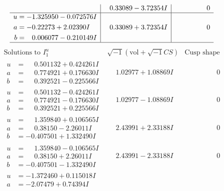 \documentclass[1p]{elsarticle_modified}
\theoremstyle{definition}
\newcommand{\I}{\sqrt{-1}}
\begin{document}
$$\begin{array}{c|c|c}
 & \phantom{-}0.33089 - 3.72354 I & \phantom{-0.000000 } 0 \\ \hline\begin{aligned}
u &= -1.325950 - 0.072576 I \\
a &= -0.22273 + 2.02390 I \\
b &= \phantom{-}0.006077 - 0.210149 I\end{aligned}
 & \phantom{-}0.33089 + 3.72354 I & \phantom{-0.000000 } 0\\
 \hline 
 \end{array}$$\newpage$$\begin{array}{c|c|c}  
\text{Solutions to }I^u_{1}& \I (\text{vol} + \sqrt{-1}CS) & \text{Cusp shape}\\
 \hline 
\begin{aligned}
u &= \phantom{-}0.501132 + 0.424261 I \\
a &= \phantom{-}0.774921 + 0.176630 I \\
b &= \phantom{-}0.392521 - 0.225566 I\end{aligned}
 & \phantom{-}1.02977 + 1.08869 I & \phantom{-0.000000 } 0 \\ \hline\begin{aligned}
u &= \phantom{-}0.501132 - 0.424261 I \\
a &= \phantom{-}0.774921 - 0.176630 I \\
b &= \phantom{-}0.392521 + 0.225566 I\end{aligned}
 & \phantom{-}1.02977 - 1.08869 I & \phantom{-0.000000 } 0 \\ \hline\begin{aligned}
u &= \phantom{-}1.359840 + 0.106565 I \\
a &= \phantom{-}0.38150 - 2.26011 I \\
b &= -0.407501 + 1.332490 I\end{aligned}
 & \phantom{-}2.43991 + 2.33188 I & \phantom{-0.000000 } 0 \\ \hline\begin{aligned}
u &= \phantom{-}1.359840 - 0.106565 I \\
a &= \phantom{-}0.38150 + 2.26011 I \\
b &= -0.407501 - 1.332490 I\end{aligned}
 & \phantom{-}2.43991 - 2.33188 I & \phantom{-0.000000 } 0 \\ \hline\begin{aligned}
u &= -1.372460 + 0.115018 I \\
a &= -2.07479 + 0.74394 I \\

\end{aligned}
\end{array}$$
\end{document}
